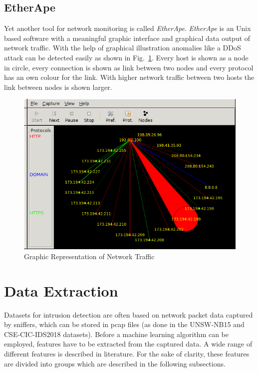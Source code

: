 \documentclass[conference]{IEEEtran}
\begin{document}
\subsection*{EtherApe}

Yet another tool for network monitoring is called \textit{EtherApe}. \textit{EtherApe} is an Unix based software with a meaningful graphic interface and graphical data output of network traffic. With the help of graphical illustration anomalies like a DDoS attack can be detected easily as shown in Fig.~\ref{etherape}. Every host is shown as a node in circle, every connection is shown as link between two nodes and every protocol has an own colour for the link. With higher network traffic between two hosts the link between nodes is shown larger.

\begin{figure}[htbp]
\centerline{\includegraphics[scale=0.37]{etherape.png}}
\caption{Graphic Representation of Network Traffic \cite{etherapewiki}}
\label{etherape}
\end{figure}

\section{Data Extraction}

Datasets for intrusion detection are often based on network packet data captured by sniffers, which can be stored in pcap files (as done in the UNSW-NB15 \cite{Nb2015} and CSE-CIC-IDS2018 \cite{Ids2018} datasets). Before a machine learning algorithm can be employed, features have to be extracted from the captured data. A wide range of different features is described in literature. For the sake of clarity, these features are divided into groups which are described in the following subsections.
\end{document}
